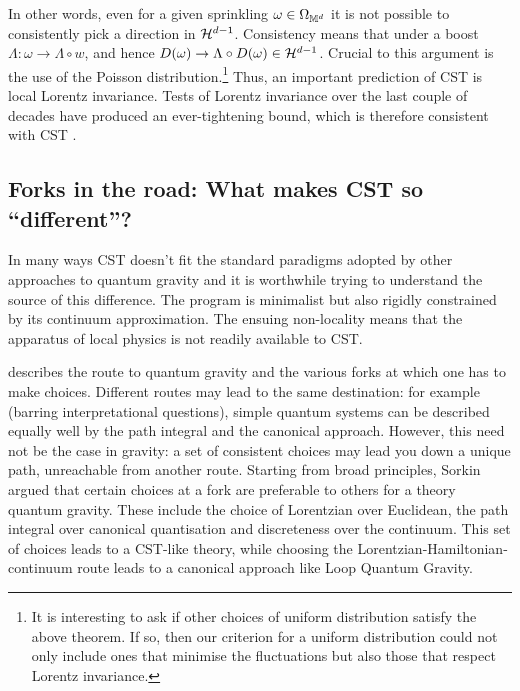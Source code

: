 In other words, even for a given sprinkling $\omega \in \Omega_{\mathbb M^d}$ it is not possible to consistently pick a
direction  in $\mathcal H^{d-1}$. Consistency means that under a boost $\Lambda: \omega \rightarrow \Lambda\circ w$, and
hence $D(\omega) \rightarrow \Lambda \circ D(\omega) \in \mathcal H^{d-1}$. Crucial to this  argument is the use of the Poisson
distribution.\footnote{It is interesting to ask if other choices of uniform distribution satisfy the above theorem. If so, then
our criterion for a uniform distribution could not only include ones that minimise the fluctuations but also those that
respect Lorentz invariance.}  Thus, an important prediction of CST is local Lorentz invariance.  Tests of Lorentz invariance over the last couple of decades have produced an ever-tightening
bound, which is therefore consistent with CST \citep{li}. 




\subsection{Forks in the road: What makes CST so ``different''?} 
\label{ssec:forks}


In many ways CST  doesn't  fit  the  standard paradigms adopted by other approaches to quantum
gravity and it is worthwhile trying to understand the source of this difference.  The program is minimalist but
also 
rigidly constrained by its continuum approximation. The ensuing non-locality  means that the apparatus of local
physics is not readily available to CST. 



\cite{lambdaone}  describes the route to quantum gravity and the various forks at which one has to make choices.
Different routes  may lead to the same destination: for example
(barring interpretational questions),   simple quantum systems  can be
described equally well by the path integral and the canonical approach. However, this
need not be the case in gravity: a set of consistent choices may lead  you down a
unique path, unreachable from another route. Starting from broad principles,  Sorkin argued that  certain
choices at a  fork are preferable to others for a theory quantum gravity. These include the choice of  Lorentzian over Euclidean,
the path integral over canonical quantisation and discreteness over the continuum.   This  set of choices leads to a
CST-like theory, while choosing the Lorentzian-Hamiltonian-continuum route  leads to a canonical approach like Loop
Quantum Gravity.


